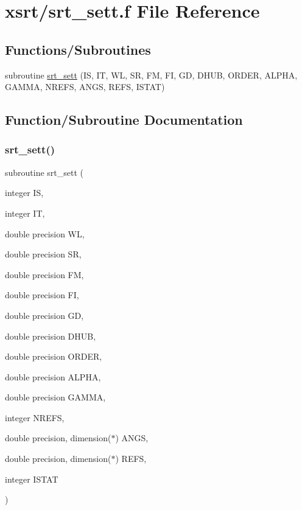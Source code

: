 \hypertarget{srt__sett_8f}{}\section{xsrt/srt\+\_\+sett.f File Reference}
\label{srt__sett_8f}
\subsection*{Functions/\+Subroutines}
\begin{DoxyCompactItemize}
\item 
subroutine \hyperlink{srt__sett_8f_a448b9413333f4b23ff9f60f42e7235b7}{srt\+\_\+sett} (IS, IT, WL, SR, FM, FI, GD, D\+H\+UB, O\+R\+D\+ER, A\+L\+P\+HA, G\+A\+M\+MA, N\+R\+E\+FS, A\+N\+GS, R\+E\+FS, I\+S\+T\+AT)
\end{DoxyCompactItemize}


\subsection{Function/\+Subroutine Documentation}
\mbox{\label{srt__sett_8f_a448b9413333f4b23ff9f60f42e7235b7}} 
\subsubsection{\texorpdfstring{srt\+\_\+sett()}{srt\_sett()}}
{\footnotesize\ttfamily subroutine srt\+\_\+sett (\begin{DoxyParamCaption}\item[{integer}]{IS,  }\item[{integer}]{IT,  }\item[{double precision}]{WL,  }\item[{double precision}]{SR,  }\item[{double precision}]{FM,  }\item[{double precision}]{FI,  }\item[{double precision}]{GD,  }\item[{double precision}]{D\+H\+UB,  }\item[{double precision}]{O\+R\+D\+ER,  }\item[{double precision}]{A\+L\+P\+HA,  }\item[{double precision}]{G\+A\+M\+MA,  }\item[{integer}]{N\+R\+E\+FS,  }\item[{double precision, dimension($\ast$)}]{A\+N\+GS,  }\item[{double precision, dimension($\ast$)}]{R\+E\+FS,  }\item[{integer}]{I\+S\+T\+AT }\end{DoxyParamCaption})}

